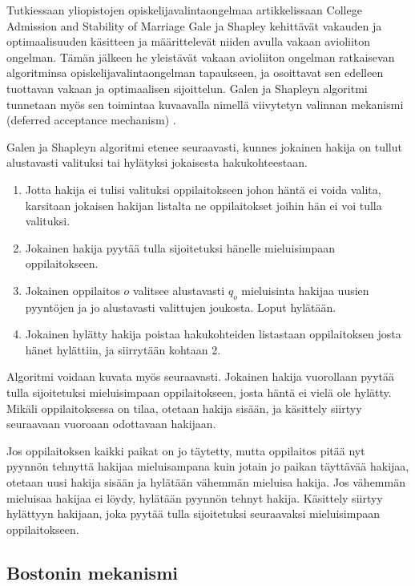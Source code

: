 \documentclass[twoside]{tktltiki}
\begin{document}
Tutkiessaan yliopistojen opiskelijavalintaongelmaa artikkelissaan
College Admission and Stability of Marriage \cite{galeshapley62} Gale
ja Shapley kehittävät vakauden ja optimaalisuuden käsitteen ja
määrittelevät niiden avulla vakaan avioliiton ongelman. Tämän jälkeen
he yleistävät vakaan avioliiton ongelman ratkaisevan algoritminsa
opiskelijavalintaongelman tapaukseen, ja osoittavat sen edelleen
tuottavan vakaan ja optimaalisen sijoittelun. Galen ja Shapleyn
algoritmi tunnetaan myös sen toimintaa kuvaavalla nimellä viivytetyn
valinnan mekanismi (deferred acceptance mechanism)
\cite{galeshapley62, kojima10}.

Galen ja Shapleyn algoritmi etenee seuraavasti, kunnes jokainen hakija
on tullut alustavasti valituksi tai hylätyksi jokaisesta
hakukohteestaan.

\begin{enumerate}
\item Jotta hakija ei tulisi valituksi oppilaitokseen johon häntä ei
  voida valita, karsitaan jokaisen hakijan listalta ne oppilaitokset
  joihin hän ei voi tulla valituksi.

\item Jokainen hakija pyytää tulla sijoitetuksi hänelle mieluisimpaan
  oppilaitokseen.

\item Jokainen oppilaitos $o$ valitsee alustavasti $q_o$ mieluisinta
  hakijaa uusien pyyntöjen ja jo alustavasti valittujen joukosta.
  Loput hylätään.

\item Jokainen hylätty hakija poistaa hakukohteiden listastaan
  oppilaitoksen josta hänet hylättiin, ja siirrytään kohtaan 2.
\end{enumerate}

Algoritmi voidaan kuvata myös seuraavasti. Jokainen hakija vuorollaan
pyytää tulla sijoitetuksi mieluisimpaan oppilaitokseen, josta häntä ei
vielä ole hylätty. Mikäli oppilaitoksessa on tilaa, otetaan hakija
sisään, ja käsittely siirtyy seuraavaan vuoroaan odottavaan hakijaan.

Jos oppilaitoksen kaikki paikat on jo täytetty, mutta oppilaitos pitää
nyt pyynnön tehnyttä hakijaa mieluisampana kuin jotain jo paikan
täyttävää hakijaa, otetaan uusi hakija sisään ja hylätään vähemmän
mieluisa hakija. Jos vähemmän mieluisaa hakijaa ei löydy, hylätään
pyynnön tehnyt hakija. Käsittely siirtyy hylättyyn hakijaan, joka
pyytää tulla sijoitetuksi seuraavaksi mieluisimpaan oppilaitokseen.

\subsection{Bostonin mekanismi}
\end{document}
